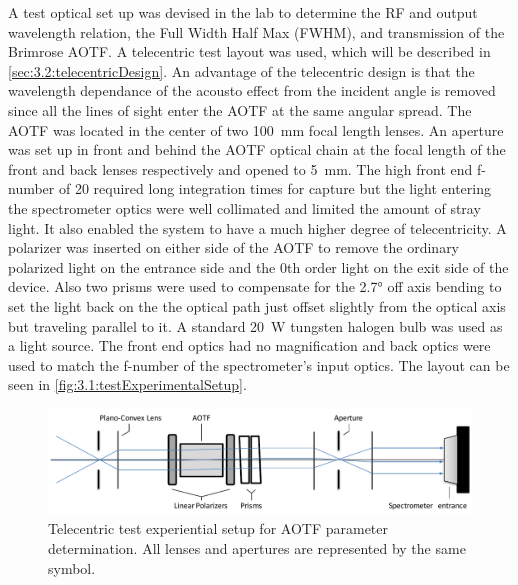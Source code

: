 A test optical set up was devised in the lab to determine the RF and output wavelength relation, the Full Width Half Max (FWHM), and transmission of the Brimrose AOTF. A telecentric test layout was used, which will be described in \autoref{sec:3.2:telecentricDesign}. An advantage of the telecentric design is that the wavelength dependance of the acousto effect from the incident angle is removed since all the lines of sight enter the AOTF at the same angular spread. The AOTF was located in the center of two 100~mm focal length lenses. An aperture was set up in front and behind the AOTF optical chain at the focal length of the front and back lenses respectively and opened to 5~mm. The high front end f-number of 20 required long integration times for capture but the light entering the spectrometer optics were well collimated and limited the amount of stray light. It also enabled the system to have a much higher degree of telecentricity. A polarizer was inserted on either side of the AOTF to remove the ordinary polarized light on the entrance side and the 0th order light on the exit side of the device. Also two prisms were used to compensate for the 2.7\si{\degree} off axis bending to set the light back on the the optical path just offset slightly from the optical axis but traveling parallel to it. A standard 20~W tungsten halogen bulb was used as a light source. The front end optics had no magnification and back optics were used to match the f-number of the spectrometer's input optics. The layout can be seen in \autoref{fig:3.1:testExperimentalSetup}.

\begin{figure}[h!]
    \includegraphics[width=1.0\textwidth]{./Images/3-1-TestExperimentalSetUp.pdf}
    \caption[AOTF Calibration Experimental Setup]{Telecentric test experiential setup for AOTF parameter determination. All lenses and apertures are represented by the same symbol.}
    \label{fig:3.1:testExperimentalSetup}
\end{figure}


